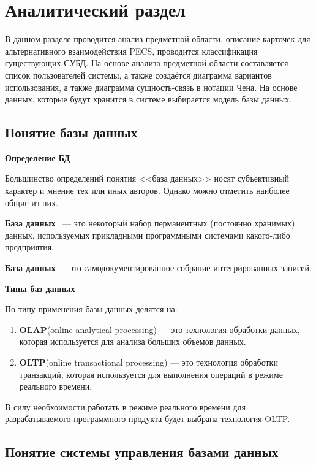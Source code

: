 \chapter{Аналитический раздел}

В данном разделе проводится анализ предметной области, описание карточек для альтернативного взаимодействия PECS, проводится классификация существующих СУБД. На основе анализа предметной области составляется список пользователей системы, а также создаётся диаграмма вариантов использования, а также диаграмма сущность-связь в нотации Чена. На основе данных, которые будут хранится в системе выбирается модель базы данных.

\section{Понятие базы данных}

\textbf{Определение БД}

Большинство определений понятия <<база данных>> носят субъективный характер и мнение тех или иных авторов.
Однако можно отметить наиболее общие из них.

\textbf{База данных}~\cite{date} --- это некоторый набор перманентных (постоянно хранимых) данных, используемых прикладными программными системами \newline какого-либо предприятия.

\textbf{База данных} --- это самодокументированное собрание интегрированных записей.

\textbf{Типы баз данных}

По типу применения базы данных делятся на:

\begin{enumerate}[label=\arabic*.]
	\item \textbf{OLAP}(online analytical processing) --- это технология обработки данных, которая используется для анализа больших объемов данных.
	\item \textbf{OLTP}(online transactional processing) --- это технология обработки транзакций, которая используется для выполнения операций в режиме реального времени.
\end{enumerate}

В силу необхоимости работать в режиме реального времени для разрабатываемого программного продукта будет выбрана технология OLTP.

\section{Понятие системы управления базами данных}

